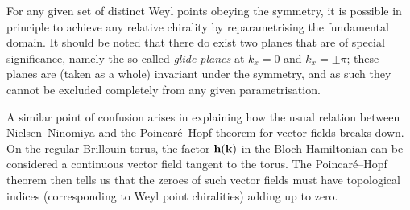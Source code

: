 For any given set of distinct Weyl points obeying the symmetry, it is possible in principle to achieve any relative chirality by reparametrising the fundamental domain.  It should be noted that there do exist two planes that are of special significance, namely the so-called \emph{glide planes} at $k_x = 0$ and $k_x = \pm\pi$; these planes are (taken as a whole) invariant under the symmetry, and as such they cannot be excluded completely from any given parametrisation.

A similar point of confusion arises in explaining how the usual relation between Nielsen--Ninomiya and the Poincaré--Hopf theorem for vector fields breaks down. On the regular Brillouin torus, the factor $\vb{h}(\vb{k})$ in the Bloch Hamiltonian can be considered a continuous vector field tangent to the torus. The Poincaré--Hopf theorem then tells us that the zeroes of such vector fields must have topological indices (corresponding to Weyl point chiralities) adding up to zero.

